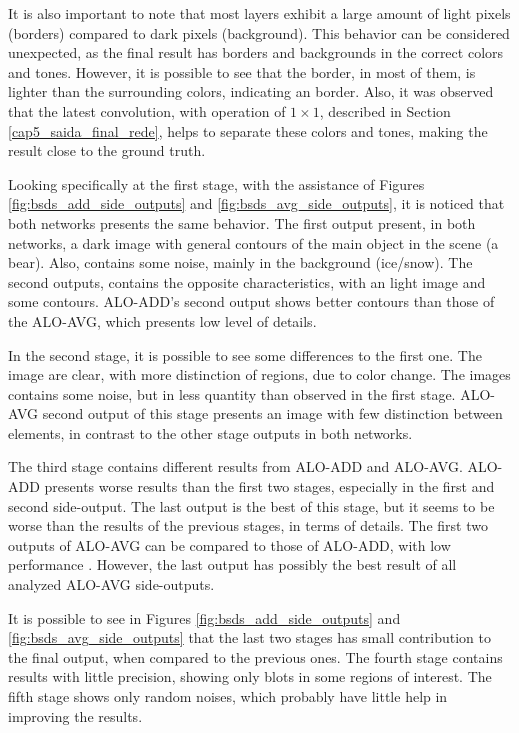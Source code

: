 It is also important to note that most layers exhibit a large amount of light pixels (borders) compared to dark pixels (background).
This behavior can be considered unexpected, as the final result has borders and backgrounds in the correct colors and tones.
However, it is possible to see that the border, in most of them, is lighter than the surrounding colors, indicating an border.
Also, it was observed that the latest convolution, with operation of $1 \times 1$, described in Section \ref{cap5_saida_final_rede}, helps to separate these colors and tones, making the result close to the ground truth.

Looking specifically at the first stage, with the assistance of Figures \ref{fig:bsds_add_side_outputs} and \ref{fig:bsds_avg_side_outputs}, it is noticed that both networks presents the same behavior.
The first output present, in both networks, a dark image with general contours of the main object in the scene (a bear).
Also, contains some noise, mainly in the background (ice/snow).
The second outputs, contains the opposite characteristics, with an light image and some contours.
ALO-ADD's second output shows better contours than those of the ALO-AVG, which presents low level of details.

In the second stage, it is possible to see some differences to the first one.
The image are clear, with more distinction of regions, due to color change.
The images contains some noise, but in less quantity than observed in the first stage.
ALO-AVG second output of this stage presents an image with few distinction between elements, in contrast to the other stage outputs in both networks.

The third stage contains different results from ALO-ADD and ALO-AVG.
ALO-ADD presents worse results than the first two stages, especially in the first and second side-output.
The last output is the best of this stage, but it seems to be worse than the results of the previous stages, in terms of details.
The first two outputs of ALO-AVG can be compared to those of ALO-ADD, with low performance .
However, the last output has possibly the best result of all analyzed ALO-AVG side-outputs.

It is possible to see in Figures \ref{fig:bsds_add_side_outputs} and \ref{fig:bsds_avg_side_outputs} that the last two stages has small contribution to the final output, when compared to the previous ones.
The fourth stage contains results with little precision, showing only blots in some regions of interest.
The fifth stage shows only random noises, which probably have little help in improving the results.

